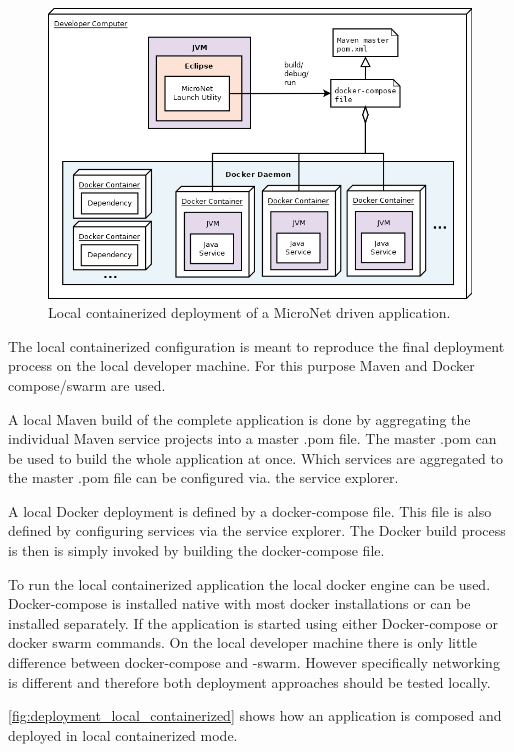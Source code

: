\begin{figure}
	\centering
	\includegraphics[width=\textwidth]{images/architecture/DeploymentLocalContainerized}
	\caption{Local containerized deployment of a MicroNet driven application.}
	\label{fig:deployment_local_containerized}
\end{figure}

The local containerized configuration is meant to reproduce the final deployment
process on the local developer machine. For this purpose Maven and Docker
compose/swarm are used. 

A local Maven build of the complete application is done by aggregating the
individual Maven service projects into a master .pom file. The master .pom can
be used to build the whole application at once. Which services are aggregated to
the master .pom file can be configured via. the service explorer.

A local Docker deployment is defined by a docker-compose file. This file is also
defined by configuring services via the service explorer. The Docker build
process is then is simply invoked by building the docker-compose file.

To run the local containerized application the local docker engine can be used.
Docker-compose is installed native with most docker installations or can be
installed separately. If the application is started using either Docker-compose
or docker swarm commands. On the local developer machine there is only little
difference between docker-compose and -swarm. However specifically networking is
different and therefore both deployment approaches should be tested locally.

\autoref{fig:deployment_local_containerized} shows how an application is
composed and deployed in local containerized mode.

